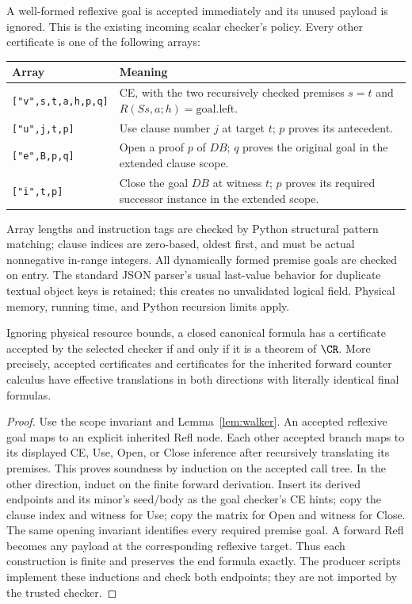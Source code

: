 A well-formed reflexive goal is accepted immediately and its unused
payload is ignored. This is the existing incoming scalar checker's
policy. Every other certificate is one of the following arrays:
\begin{center}
\small
\begin{tabularx}{\textwidth}{@{}lX@{}}
\toprule
Array & Meaning\\
\midrule
\texttt{["v",s,t,a,h,p,q]} &
CE, with the two recursively checked premises $s=t$ and
$R(Ss,a;h)=\text{goal.left}$.\\
\texttt{["u",j,t,p]} &
Use clause number $j$ at target $t$; $p$ proves its antecedent.\\
\texttt{["e",B,p,q]} &
Open a proof $p$ of $D B$; $q$ proves the original goal in the extended
clause scope.\\
\texttt{["i",t,p]} &
Close the goal $D B$ at witness $t$; $p$ proves its required successor
instance in the extended scope.\\
\bottomrule
\end{tabularx}
\end{center}
Array lengths and instruction tags are checked by Python structural
pattern matching; clause indices are zero-based, oldest first, and must be actual nonnegative
in-range integers. All dynamically formed premise goals are checked on entry.
The standard JSON parser's usual last-value behavior for duplicate textual
object keys is retained; this creates no unvalidated logical field.
Physical memory, running time, and Python recursion limits apply.

\begin{theorem}\label{thm:checker}
Ignoring physical resource bounds, a closed canonical formula has a
certificate accepted by the selected checker if and only if it is a
theorem of $\CR$. More precisely, accepted certificates and certificates
for the inherited forward counter calculus have effective translations
in both directions with literally identical final formulas.
\end{theorem}
\begin{proof}
Use the scope invariant and Lemma~\ref{lem:walker}. An accepted reflexive
goal maps to an explicit inherited Refl node. Each other accepted
branch maps to its displayed CE, Use, Open, or Close inference after
recursively translating its premises. This proves soundness by induction
on the accepted call tree. In the other direction, induct on the finite
forward derivation. Insert its derived endpoints and its minor's seed/body
as the goal checker's CE hints; copy the clause index and witness for Use;
copy the matrix for Open and witness for Close. The same opening
invariant identifies every required premise goal. A forward Refl becomes
any payload at the corresponding reflexive target. Thus each construction
is finite and preserves the end formula exactly. The producer scripts
implement these inductions and check both endpoints; they are not imported
by the trusted checker.
\end{proof}

